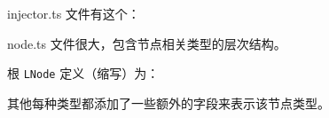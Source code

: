 injector.ts 文件有这个：




node.ts 文件很大，包含节点相关类型的层次结构。


根 \texttt{LNode} 定义（缩写）为：




其他每种类型都添加了一些额外的字段来表示该节点类型。
